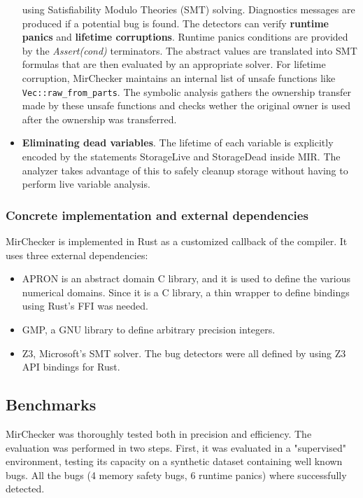 \documentclass{article}
\begin{document}
\begin{itemize}
    using Satisfiability Modulo Theories (SMT) solving. Diagnostics messages are produced if a potential bug is found. The detectors 
    can verify \textbf{runtime panics} and \textbf{lifetime corruptions}. Runtime panics conditions 
    are provided by the \textit{Assert(cond)} terminators. The abstract values are translated into SMT formulas 
    that are then evaluated by an appropriate solver. For lifetime corruption, MirChecker maintains an internal 
    list of unsafe functions like \texttt{Vec::raw_from_parts}. The symbolic analysis gathers the ownership transfer made by these unsafe functions and checks wether the original owner is used 
    after the ownership was transferred.
    \item \textbf{Eliminating dead variables}. The lifetime of each variable is explicitly encoded by the statements 
    StorageLive and StorageDead inside MIR. The analyzer takes advantage of this to safely cleanup storage without having to perform 
    live variable analysis.
\end{itemize}
\subsubsection{Concrete implementation and external dependencies}

MirChecker is implemented in Rust as a customized callback of the compiler.  It uses three external dependencies: \begin{itemize}
    \item APRON is an abstract domain C library, and it is used to define  the various numerical domains. Since it is a C library, 
    a thin wrapper to define  bindings using  Rust's FFI was needed.
    \item GMP, a GNU library to define arbitrary precision integers. 
    \item Z3, Microsoft's SMT solver. The bug detectors were all defined by using Z3 API bindings for Rust.
\end{itemize}
\subsection{Benchmarks}
MirChecker  was thoroughly tested both in precision and efficiency. The evaluation was performed
in two steps. First, it was evaluated in a "supervised" environment, testing its capacity on a synthetic dataset 
containing well known bugs. All the bugs (4 memory safety bugs, 6 runtime panics) where successfully detected. 
\end{document}

